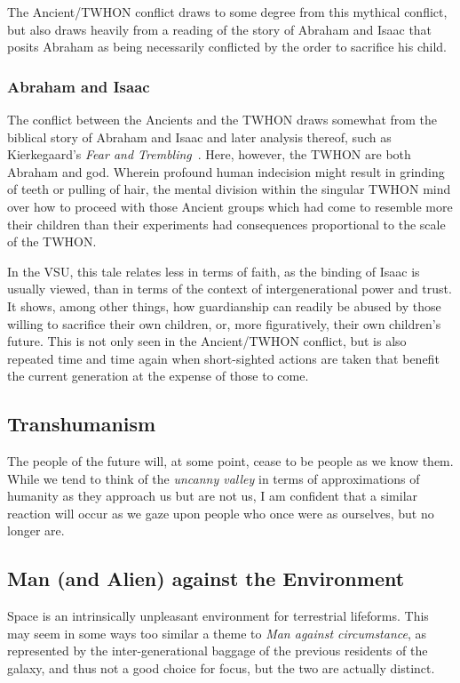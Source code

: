 The Ancient/TWHON conflict draws to some degree from this mythical
conflict, but also draws heavily from a reading of the story of
Abraham and Isaac that posits Abraham as being necessarily conflicted
by the order to sacrifice his child.

\subsubsection{Abraham and Isaac}

The conflict between the Ancients and the TWHON draws somewhat from
the biblical story of Abraham and Isaac and later analysis thereof,
such as Kierkegaard's \emph{Fear and
Trembling}~\cite{KierkegaardFearandTrembling}. Here, however, the
TWHON are both Abraham and god. Wherein profound human indecision
might result in grinding of teeth or pulling of hair, the mental
division within the singular TWHON mind over how to proceed with those
Ancient groups which had come to resemble more their children than
their experiments had consequences proportional to the scale of the
TWHON.

In the VSU, this tale relates less in terms of faith, as the binding
of Isaac is usually viewed, than in terms of the context of
intergenerational power and trust. It shows, among other things, how
guardianship can readily be abused by those willing to sacrifice their
own children, or, more figuratively, their own children's future. This
is not only seen in the Ancient/TWHON conflict, but is also repeated
time and time again when short-sighted actions are taken that benefit
the current generation at the expense of those to come.

\subsection{Transhumanism}

The people of the future will, at some point, cease to be people as we
know them. While we tend to think of the {\em uncanny valley} in terms
of approximations of humanity as they approach us but are not us, I am
confident that a similar reaction will occur as we gaze upon people
who once were as ourselves, but no longer are.

\subsection{Man (and Alien) against the Environment}

Space is an intrinsically unpleasant environment for terrestrial
lifeforms. This may seem in some ways too similar a theme to {\em Man
against circumstance}, as represented by the inter-generational
baggage of the previous residents of the galaxy, and thus not a good
choice for focus, but the two are actually distinct.

